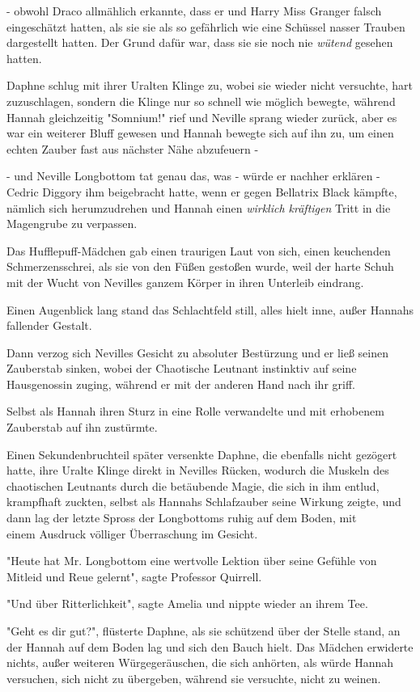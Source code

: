 {- obwohl Draco allmählich erkannte, dass er und Harry Miss Granger falsch eingeschätzt hatten, als sie sie als so gefährlich wie eine Schüssel nasser Trauben dargestellt hatten. Der Grund dafür war, dass sie sie noch nie \emph{wütend} gesehen hatten.

Daphne schlug mit ihrer Uralten Klinge zu, wobei sie wieder nicht versuchte, hart zuzuschlagen, sondern die Klinge nur so schnell wie möglich bewegte, während Hannah gleichzeitig "Somnium!" rief und Neville sprang wieder zurück, aber es war ein weiterer Bluff gewesen und Hannah bewegte sich auf ihn zu, um einen echten Zauber fast aus nächster Nähe abzufeuern -

- und Neville Longbottom tat genau das, was - würde er nachher erklären - Cedric Diggory ihm beigebracht hatte, wenn er gegen Bellatrix Black kämpfte, nämlich sich herumzudrehen und Hannah einen \emph{wirklich kräftigen} Tritt in die Magengrube zu verpassen.

Das Hufflepuff-Mädchen gab einen traurigen Laut von sich, einen keuchenden Schmerzensschrei, als sie von den Füßen gestoßen wurde, weil der harte Schuh mit der Wucht von Nevilles ganzem Körper in ihren Unterleib eindrang.

Einen Augenblick lang stand das Schlachtfeld still, alles hielt inne, außer Hannahs fallender Gestalt.

Dann verzog sich Nevilles Gesicht zu absoluter Bestürzung und er ließ seinen Zauberstab sinken, wobei der Chaotische Leutnant instinktiv auf seine Hausgenossin zuging, während er mit der anderen Hand nach ihr griff.

Selbst als Hannah ihren Sturz in eine Rolle verwandelte und mit erhobenem Zauberstab auf ihn zustürmte.

Einen Sekundenbruchteil später versenkte Daphne, die ebenfalls nicht gezögert hatte, ihre Uralte Klinge direkt in Nevilles Rücken, wodurch die Muskeln des chaotischen Leutnants durch die betäubende Magie, die sich in ihm entlud, krampfhaft zuckten, selbst als Hannahs Schlafzauber seine Wirkung zeigte, und dann lag der letzte Spross der Longbottoms ruhig auf dem Boden, mit\\ einem Ausdruck völliger Überraschung im Gesicht.

"Heute hat Mr. Longbottom eine wertvolle Lektion über seine Gefühle von Mitleid und Reue gelernt", sagte Professor Quirrell.

"Und über Ritterlichkeit", sagte Amelia und nippte wieder an ihrem Tee.

"Geht es dir gut?", flüsterte Daphne, als sie schützend über der Stelle stand, an der Hannah auf dem Boden lag und sich den Bauch hielt. Das Mädchen erwiderte nichts, außer weiteren Würgegeräuschen, die sich anhörten, als würde Hannah versuchen, sich nicht zu übergeben, während sie versuchte, nicht zu weinen.

}
